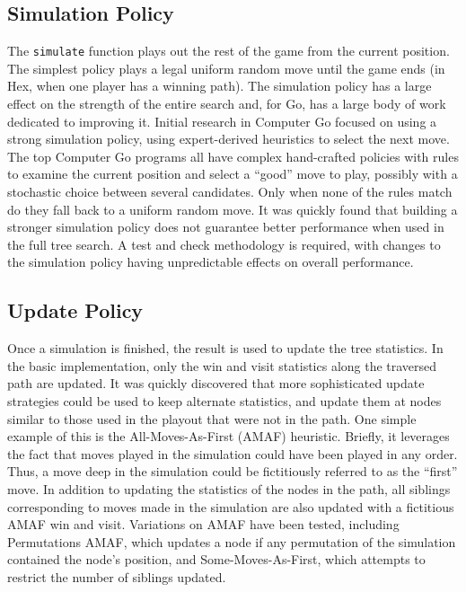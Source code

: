 \documentclass[11pt]{report}
\begin{document}
\subsection{Simulation Policy}
The \texttt{simulate} function plays out the rest of the game from the current position. The simplest policy plays a legal uniform random move until the game ends (in Hex, when one player has a winning path). The simulation policy has a large effect on the strength of the entire search and, for Go, has a large body of work dedicated to improving it.
Initial research in Computer Go focused on using a strong simulation policy, using expert-derived heuristics to select the next move\cite{chaslot2010adding}. The top Computer Go programs all have complex hand-crafted policies with rules to examine the current position and select a ``good'' move to play, possibly with a stochastic choice between several candidates. Only when none of the rules match do they fall back to a uniform random move. It was quickly found that building a stronger simulation policy does not guarantee better performance when used in the full tree search\cite{gelly2006modification}. A test and check methodology is required, with changes to the simulation policy having unpredictable effects on overall performance.

\subsection{Update Policy}
Once a simulation is finished, the result is used to update the tree statistics. In the basic implementation, only the win and visit statistics along the traversed path are updated. It was quickly discovered that more sophisticated update strategies could be used to keep alternate statistics, and update them at nodes similar to those used in the playout that were not in the path. One simple example of this is the All-Moves-As-First (AMAF) heuristic. Briefly, it leverages the fact that moves played in the simulation could have been played in any order. Thus, a move deep in the simulation could be fictitiously referred to as the ``first'' move. In addition to updating the statistics of the nodes in the path, all siblings corresponding to moves made in the simulation are also updated with a fictitious AMAF win and visit. Variations on AMAF have been tested, including Permutations AMAF, which updates a node if any permutation of the simulation contained the node's position, and Some-Moves-As-First, which attempts to restrict the number of siblings updated.
\end{document}
